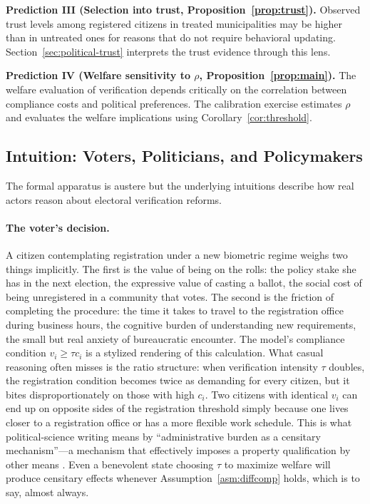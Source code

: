\textbf{Prediction III (Selection into trust, Proposition~\ref{prop:trust}).} Observed trust levels among registered citizens in treated municipalities may be higher than in untreated ones for reasons that do not require behavioral updating. Section~\ref{sec:political-trust} interprets the trust evidence through this lens.

\textbf{Prediction IV (Welfare sensitivity to $\rho$, Proposition~\ref{prop:main}).} The welfare evaluation of verification depends critically on the correlation between compliance costs and political preferences. The calibration exercise estimates $\rho$ and evaluates the welfare implications using Corollary~\ref{cor:threshold}.

\subsection{Intuition: Voters, Politicians, and Policymakers}
\label{ssec:intuition}

The formal apparatus is austere but the underlying intuitions describe how real actors reason about electoral verification reforms.

\paragraph{The voter's decision.} A citizen contemplating registration under a new biometric regime weighs two things implicitly. The first is the value of being on the rolls: the policy stake she has in the next election, the expressive value of casting a ballot, the social cost of being unregistered in a community that votes. The second is the friction of completing the procedure: the time it takes to travel to the registration office during business hours, the cognitive burden of understanding new requirements, the small but real anxiety of bureaucratic encounter. The model's compliance condition $v_i \geq \tau c_i$ is a stylized rendering of this calculation. What casual reasoning often misses is the ratio structure: when verification intensity $\tau$ doubles, the registration condition becomes twice as demanding for every citizen, but it bites disproportionately on those with high $c_i$. Two citizens with identical $v_i$ can end up on opposite sides of the registration threshold simply because one lives closer to a registration office or has a more flexible work schedule. This is what political-science writing means by ``administrative burden as a censitary mechanism''---a mechanism that effectively imposes a property qualification by other means \citep{Herd2018}. Even a benevolent state choosing $\tau$ to maximize welfare will produce censitary effects whenever Assumption~\ref{asm:diffcomp} holds, which is to say, almost always.

